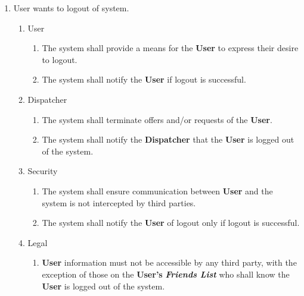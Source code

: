 \documentclass[english]{article}
\begin{document}
\begin{enumerate}[{BE}1.]
	\item User wants to logout of system. 
	\begin{enumerate}[{VP7}.1]
		\item User
			\begin{enumerate}
				\item The system shall provide a means for the \textbf{User} to express their desire to logout.
				\item The system shall notify the \textbf{User} if logout is successful. 
			\end{enumerate}
		\item Dispatcher
			\begin{enumerate}
				\item The system shall terminate offers and/or requests of the \textbf{User}.
				\item The system shall notify the \textbf{Dispatcher} that the \textbf{User} is logged out of the system. 
			\end{enumerate}
		\item Security
			\begin{enumerate}
				\item The system shall ensure communication between \textbf{User} and the system is not intercepted by third parties.
				\item The system shall notify the \textbf{User} of logout only if logout is successful.
			\end{enumerate}
		\item Legal
			\begin{enumerate}
				\item \textbf{User} information must not be accessible by any third party, with the exception of those on the \textbf{User's} \textbf{\emph{Friends List}} who shall know the \textbf{User} is logged out of the system. 
			\end{enumerate}
	\end{enumerate}
	

\end{enumerate}
\end{document}
